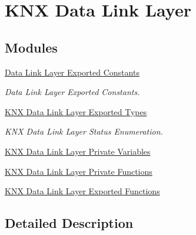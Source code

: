 \hypertarget{group___k_n_x___d_l}{}\section{K\+NX Data Link Layer}
\label{group___k_n_x___d_l}
\subsection*{Modules}
\begin{DoxyCompactItemize}
\item 
\hyperlink{group___d_l___exported___constants}{Data Link Layer Exported Constants}
\begin{DoxyCompactList}\small\item\em Data Link Layer Exported Constants. \end{DoxyCompactList}\item 
\hyperlink{group___k_n_x___d_l___exported___types}{K\+N\+X Data Link Layer Exported Types}
\begin{DoxyCompactList}\small\item\em K\+NX Data Link Layer Status Enumeration. \end{DoxyCompactList}\item 
\hyperlink{group___k_n_x___d_l___private___variables}{K\+N\+X Data Link Layer Private Variables}
\item 
\hyperlink{group___k_n_x___d_l___private___functions}{K\+N\+X Data Link Layer Private Functions}
\item 
\hyperlink{group___k_n_x___d_l___exported___functions}{K\+N\+X Data Link Layer Exported Functions}
\end{DoxyCompactItemize}


\subsection{Detailed Description}

